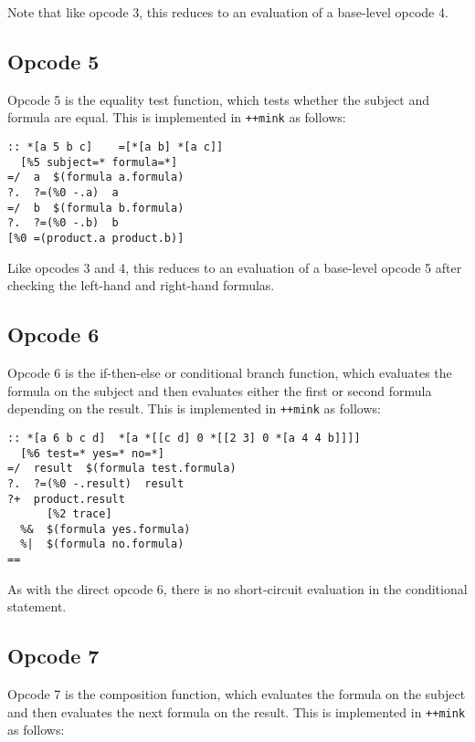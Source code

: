 \documentclass[twoside]{article}
\begin{document}
\noindent
Note that like opcode 3, this reduces to an evaluation of a base-level opcode 4.

\subsection{Opcode 5}

Opcode 5 is the equality test function, which tests whether the subject and formula are equal.  This is implemented in \lstinline[style=inlinecode]{++mink} as follows:

\begin{lstlisting}[style=listingcode]
:: *[a 5 b c]    =[*[a b] *[a c]]
  [%5 subject=* formula=*]
=/  a  $(formula a.formula)
?.  ?=(%0 -.a)  a
=/  b  $(formula b.formula)
?.  ?=(%0 -.b)  b
[%0 =(product.a product.b)]
\end{lstlisting}

\noindent
Like opcodes 3 and 4, this reduces to an evaluation of a base-level opcode 5 after checking the left-hand and right-hand formulas.

\subsection{Opcode 6}

Opcode 6 is the if-then-else or conditional branch function, which evaluates the formula on the subject and then evaluates either the first or second formula depending on the result.  This is implemented in \lstinline[style=inlinecode]{++mink} as follows:

\begin{lstlisting}[style=listingcode]
:: *[a 6 b c d]  *[a *[[c d] 0 *[[2 3] 0 *[a 4 4 b]]]]
  [%6 test=* yes=* no=*]
=/  result  $(formula test.formula)
?.  ?=(%0 -.result)  result
?+  product.result
      [%2 trace]
  %&  $(formula yes.formula)
  %|  $(formula no.formula)
==
\end{lstlisting}

\noindent
As with the direct opcode 6, there is no short-circuit evaluation in the conditional statement.

\subsection{Opcode 7}

Opcode 7 is the composition function, which evaluates the formula on the subject and then evaluates the next formula on the result.  This is implemented in \lstinline[style=inlinecode]{++mink} as follows:
\end{document}
